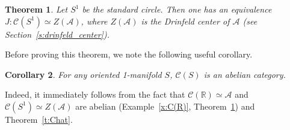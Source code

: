 \documentclass{amsart}
\newtheorem{theorem}{Theorem}[section]
\newtheorem{corollary}[theorem]{Corollary}
\theoremstyle{definition}
\theoremstyle{remark}
\numberwithin{equation}{section}
\newcommand{\thref}[1]{Theorem~{\rm\ref{#1}}}
\newcommand{\exref}[1]{Example~{\rm\ref{#1}}}
\newcommand{\seref}[1]{Section~{\rm\ref{#1}}}
\newcommand{\<}{\langle}
\renewcommand{\>}{\rangle}
\newcommand{\R}{\mathbb{R}}       %
\newcommand{\C}{\mathcal{C}}      %
\newcommand{\A}{\mathcal{A}}      %
\begin{document}
\begin{theorem}\label{t:drinfeld_center}
 Let $S^1$ be the standard circle. Then one has an 
 equivalence   $J\colon \C(S^1)\simeq Z(\A)$, where $Z(\A)$ is the Drinfeld
center of $\A$ \textup{(}see  \seref{s:drinfeld_center}\textup{)}. 
\end{theorem}

Before proving this theorem, we note the following useful corollary.

\begin{corollary}
For any oriented 1-manifold $S$, $\C(S)$ is an abelian category.
\end{corollary}

Indeed, it immediately follows from the fact that $\C(\R)\simeq \A$ and
$\C(S^1)\simeq Z(\A)$ are abelian (\exref{x:C(R)},
\thref{t:drinfeld_center}) and \thref{t:Chat}. 
\end{document}
